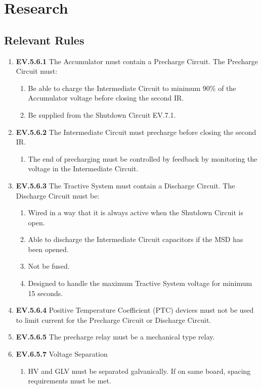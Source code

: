 \documentclass{article}
\begin{document}
\section{Research}
\subsection{Relevant Rules}
\begin{enumerate}
	\item[\textbullet] \textbf{EV.5.6.1} The Accumulator must contain a Precharge Circuit. The Precharge Circuit must:
	      \begin{enumerate}
		      \item Be able to charge the Intermediate Circuit to minimum 90\% of the Accumulator voltage before closing the second IR.
		      \item Be supplied from the Shutdown Circuit EV.7.1.
	      \end{enumerate}

	\item[\textbullet] \textbf{EV.5.6.2} The Intermediate Circuit must precharge before closing the second IR.
	      \begin{enumerate}
		      \item The end of precharging must be controlled by feedback by monitoring the voltage in the Intermediate Circuit.
	      \end{enumerate}

	\item[\textbullet] \textbf{EV.5.6.3} The Tractive System must contain a Discharge Circuit. The Discharge Circuit must be:
	      \begin{enumerate}
		      \item Wired in a way that it is always active when the Shutdown Circuit is open.
		      \item Able to discharge the Intermediate Circuit capacitors if the MSD has been opened.
		      \item Not be fused.
		      \item Designed to handle the maximum Tractive System voltage for minimum 15 seconds.
	      \end{enumerate}

	\item[\textbullet] \textbf{EV.5.6.4} Positive Temperature Coefficient (PTC) devices must not be used to limit current for the Precharge Circuit or Discharge Circuit.

	\item[\textbullet] \textbf{EV.5.6.5} The precharge relay must be a mechanical type relay.

	\item[\textbullet] \textbf{EV.6.5.7} Voltage Separation
	      \begin{enumerate}
		      \item HV and GLV must be separated galvanically. If on same board, spacing requirements must be met.
	      \end{enumerate}
\end{enumerate}
\end{document}
